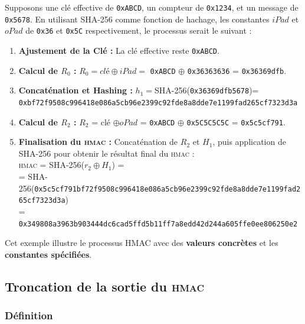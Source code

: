 \documentclass[a4paper, 10pt]{article}
\newcommand{\hmac}{\textsc{hmac} }
\begin{document}
\noindent
Supposons une clé effective de \textcolor{mygreen}{\texttt{0xABCD}}, un compteur de \textcolor{mygreen}{\texttt{0x1234}}, et un message de \textcolor{mygreen}{\texttt{0x5678}}. En utilisant SHA-256 comme fonction de hachage, les constantes $iPad$ et $oPad$ de \texttt{0x36} et \texttt{0x5C} respectivement, le processus serait le suivant :\\
\begin{enumerate}
    \item \textbf{Ajustement de la Clé :} La clé effective reste \texttt{0xABCD}.\\
    \item \textbf{Calcul de $R_0$ :} $R_0 = clé \oplus iPad =$ \texttt{0xABCD} $\oplus$ \texttt{0x36363636} = \texttt{0x36369dfb}.\\
    \item \textbf{Concaténation et Hashing :} $h_1=$SHA-256(\texttt{0x36369dfb5678})=\\
        \texttt{0xbf72f9508c996418e086a5cb96e2399c92fde8a8dde7e1199fad265cf7323d3a}
        \\
    \item \textbf{Calcul de $R_2$ :} $R_2$ = clé $\oplus oPad$ = \texttt{0xABCD} $\oplus$ \texttt{0x5C5C5C5C} = \texttt{0x5c5cf791}.\\
    \item \textbf{Finalisation du \hmac :} Concaténation de $R_2$ et $H_1$, puis application de SHA-256 pour obtenir le résultat final du \hmac :\\
    \hmac = SHA-256($r_2 \oplus H_1$) =\\
    = SHA-256(\texttt{0x5c5cf791bf72f9508c996418e086a5cb96e2399c92fde8a8dde7e1199fad265cf7323d3a})\\
     = \texttt{0x349808a3963b903444dc6cad5ffd5b11ff7a8edd42d244a605ffe0ee806250e2}\\
\end{enumerate}

\noindent
Cet exemple illustre le processus HMAC avec des \textbf{valeurs concrètes} et les \textbf{constantes spécifiées}.


    
    \subsection{Troncation de la sortie du \hmac}

        \subsubsection{Définition}
\end{document}
